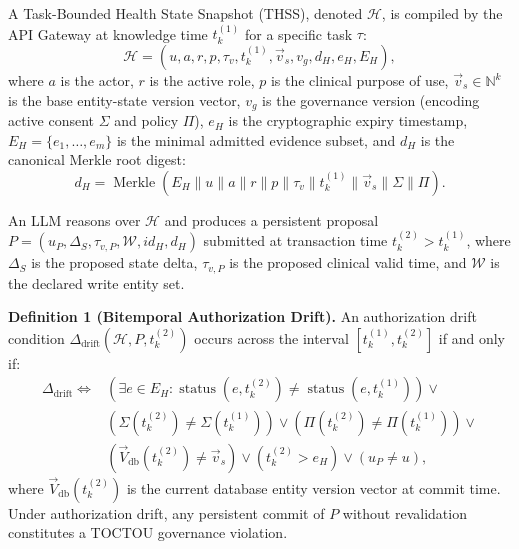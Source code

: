 \documentclass[conference,a4paper]{IEEEtran}
\begin{document}
A Task-Bounded Health State Snapshot (THSS), denoted $\mathcal{H}$, is compiled by the API Gateway at knowledge time $t_k^{(1)}$ for a specific task $\tau$:
\begin{equation}
\mathcal{H} = (u, a, r, p, \tau_v, t_k^{(1)}, \vec{v}_s, v_g, d_H, e_H, E_H),
\end{equation}
where $a$ is the actor, $r$ is the active role, $p$ is the clinical purpose of use, $\vec{v}_s \in \mathbb{N}^k$ is the base entity-state version vector, $v_g$ is the governance version (encoding active consent $\Sigma$ and policy $\Pi$), $e_H$ is the cryptographic expiry timestamp, $E_H = \{e_1, \dots, e_m\}$ is the minimal admitted evidence subset, and $d_H$ is the canonical Merkle root digest:
\begin{equation}
d_H = \operatorname{Merkle}\left( E_H \parallel u \parallel a \parallel r \parallel p \parallel \tau_v \parallel t_k^{(1)} \parallel \vec{v}_s \parallel \Sigma \parallel \Pi \right).
\end{equation}

An LLM reasons over $\mathcal{H}$ and produces a persistent proposal $P = (u_P, \Delta_S, \tau_{v,P}, \mathcal{W}, id_H, d_H)$ submitted at transaction time $t_k^{(2)} > t_k^{(1)}$, where $\Delta_S$ is the proposed state delta, $\tau_{v,P}$ is the proposed clinical valid time, and $\mathcal{W}$ is the declared write entity set.

\textbf{Definition 1 (Bitemporal Authorization Drift).} An authorization drift condition $\Delta_{\text{drift}}(\mathcal{H}, P, t_k^{(2)})$ occurs across the interval $[t_k^{(1)}, t_k^{(2)}]$ if and only if:
\begin{align}
\Delta_{\text{drift}} \iff & \left( \exists e \in E_H : \operatorname{status}(e, t_k^{(2)}) \neq \operatorname{status}(e, t_k^{(1)}) \right) \lor \nonumber\\
& \left( \Sigma(t_k^{(2)}) \neq \Sigma(t_k^{(1)}) \right) \lor \left( \Pi(t_k^{(2)}) \neq \Pi(t_k^{(1)}) \right) \lor \nonumber\\
& \left( \vec{V}_{\text{db}}(t_k^{(2)}) \neq \vec{v}_s \right) \lor \left( t_k^{(2)} > e_H \right) \lor \left( u_P \neq u \right),
\end{align}
where $\vec{V}_{\text{db}}(t_k^{(2)})$ is the current database entity version vector at commit time. Under authorization drift, any persistent commit of $P$ without revalidation constitutes a TOCTOU governance violation.
\end{document}
